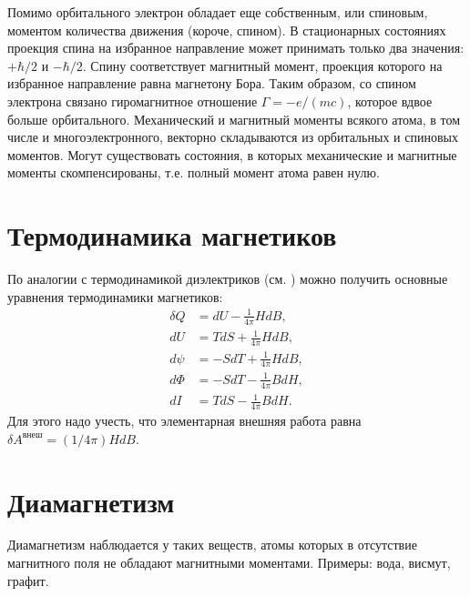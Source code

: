 \documentclass[12pt]{article}
\begin{document}
  Помимо орбитального электрон обладает еще собственным, или спиновым, моментом количества движения (короче, спином). В стационарных состояниях проекция спина на избранное направление может принимать только два значения: $+\hbar / 2$ и $-\hbar / 2$. Спину соответствует магнитный момент, проекция которого на избранное направление равна магнетону Бора. Таким образом, со спином электрона связано гиромагнитное отношение $\Gamma=-e /(m c)$, которое вдвое больше орбитального. Механический и магнитный моменты всякого атома, в том числе и многоэлектронного, векторно складываются из орбитальных и спиновых моментов. Могут существовать состояния, в которых механические и магнитные моменты скомпенсированы, т.е. полный момент атома равен нулю.

  \section{Термодинамика магнетиков}
  По аналогии с термодинамикой диэлектриков (см. \cite[\S31]{sivykhin3}) можно получить основные уравнения
  термодинамики магнетиков:
  \begin{align}
    \delta Q  &= dU - \frac{1}{4\pi}HdB,\\
    dU &= TdS + \frac{1}{4\pi}HdB,\\ \label{eq:term3}
    d\psi &= -SdT + \frac{1}{4\pi}HdB,\\ \label{eq:term4}
    d\Phi &= -SdT - \frac{1}{4\pi}BdH,\\
    dI &= TdS - \frac{1}{4\pi}BdH.
  \end{align}
  Для этого надо учесть, что элементарная внешняя работа равна $\delta A^{\text{внеш}} = (1/4\pi)HdB$.

  \section{Диамагнетизм}
  Диамагнетизм наблюдается у таких веществ, атомы которых в отсутствие магнитного поля не обладают магнитными моментами. Примеры:
  вода, висмут, графит.
\end{document}
